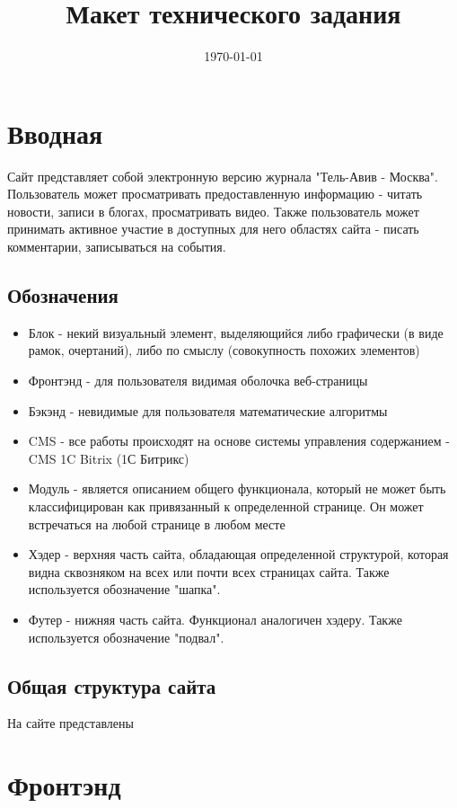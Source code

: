 \documentclass[DIV=calc, paper=a4, fontsize=11pt]{scrartcl} %
\title{Макет технического задания} %
\date{\today} %
\begin{document}
\maketitle

\section{Вводная}
Сайт представляет собой электронную версию журнала "Тель-Авив - Москва". Пользователь может просматривать предоставленную информацию - читать новости, записи в блогах, просматривать видео. Также пользователь может принимать активное участие в доступных для него областях сайта - писать комментарии, записываться на события.

\subsection{Обозначения}

\begin{itemize}
\item Блок - некий визуальный элемент, выделяющийся либо графически (в виде рамок, очертаний), либо по смыслу (совокупность похожих элементов)
\item Фронтэнд - для пользователя видимая оболочка веб-страницы
\item Бэкэнд - невидимые для пользователя математические алгоритмы
\item CMS - все работы происходят на основе системы управления содержанием - CMS 1C Bitrix (1С Битрикс)
\item Модуль - является описанием общего функционала, который не может быть классифицирован как привязанный к определенной странице. Он может встречаться на любой странице в любом месте
\item Хэдер - верхняя часть сайта, обладающая определенной структурой, которая видна сквозняком на всех или почти всех страницах сайта. Также используется обозначение "шапка".
\item Футер - нижняя часть сайта. Функционал аналогичен хэдеру. Также используется обозначение "подвал".
\end{itemize}

\subsection{Общая структура сайта}

На сайте представлены 

\section{Фронтэнд}
\end{document}
